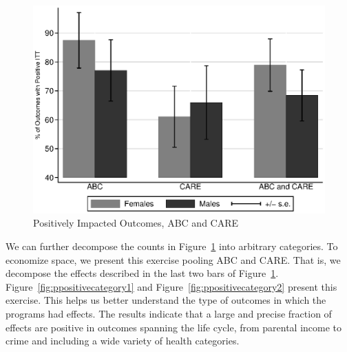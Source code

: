 \begin{figure}[H]
		\caption{Positively Impacted Outcomes, ABC and CARE} \label{fig:ppositive}
		\includegraphics[width=.9\columnwidth]{output/itt_noctrl_all.eps}
\end{figure}

\noindent We can further decompose the counts in Figure~\ref{fig:ppositive} into arbitrary categories. To economize space, we present this exercise pooling ABC and CARE. That is, we decompose the effects described in the last two bars of Figure~\ref{fig:ppositive}. Figure~\ref{fig:ppositivecategory1} and Figure~\ref{fig:ppositivecategory2} present this exercise. This helps us better understand the type of outcomes in which the programs had effects. The results indicate that a large and precise fraction of effects are positive in outcomes spanning the life cycle, from parental income to crime and including a wide variety of health categories.\\

